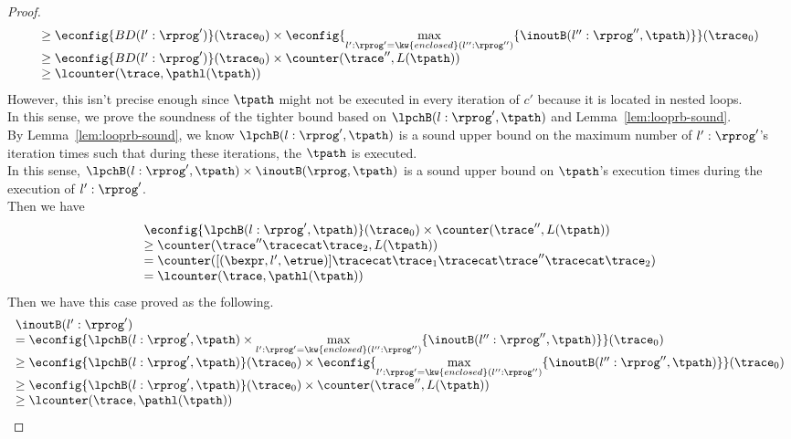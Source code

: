 \begin{proof}
\[\begin{array}{l}
  \geq \econfig{ BD(l':\rprog')}(\trace_0) \times 
  \econfig{\max\limits_{l': \rprog' = \kw{enclosed}(l'':\rprog'')} \{\inoutB(l'':\rprog'', \tpath)\}}
  (\trace_0)\\
  \geq \econfig{ BD(l':\rprog')}(\trace_0) \times \counter(\trace'', L(\tpath)) \\
  \geq \lcounter(\trace, \pathl(\tpath))
  \end{array}
\]
However, this isn't precise enough since $\tpath$ might not be executed in every iteration of $c'$ because it is located in nested loops. 
\\
In this sense, we prove the soundness of the tighter bound based on $\lpchB(l:\rprog', \tpath)$ and Lemma~\ref{lem:looprb-sound}.
\\
By Lemma~\ref{lem:looprb-sound}, we know $\lpchB(l:\rprog', \tpath)$ is a sound upper bound on the maximum number of $l': \rprog'$'s iteration times such that during these iterations, the $\tpath$ is executed.
\\
In this sense, $\lpchB(l:\rprog', \tpath) \times \inoutB(\rprog, \tpath)$ is a sound upper bound on $\tpath$'s execution times during the execution of $l': \rprog'$.
\\
Then we have
\[
  \begin{array}{l}
  \econfig{ \lpchB(l:\rprog', \tpath)}(\trace_0) \times \counter(\trace'', L(\tpath)) \\
  \geq \counter(\trace'' \tracecat \trace_2, L(\tpath))\\
  = \counter([(\bexpr, l', \etrue)] \tracecat \trace_1 \tracecat \trace'' \tracecat \trace_2)\\
  = \lcounter(\trace, \pathl(\tpath))
  \end{array}
\]
Then we have this case proved as the following.
\[
  \begin{array}{l}
  \inoutB(l':\rprog') \\
  = \econfig{ \lpchB(l:\rprog', \tpath) \times \max\limits_{l': \rprog' = \kw{enclosed}(l'':\rprog'')} \{\inoutB(l'':\rprog'', \tpath)\}}(\trace_0) \\
  \geq \econfig{ \lpchB(l:\rprog', \tpath) }(\trace_0) \times
  \econfig{\max\limits_{l': \rprog' = \kw{enclosed}(l'':\rprog'')} \{\inoutB(l'':\rprog'', \tpath)\}} 
  (\trace_0) \\
  \geq \econfig{ \lpchB(l:\rprog', \tpath)}(\trace_0) \times \counter(\trace'', L(\tpath)) \\
  \geq \lcounter(\trace, \pathl(\tpath))
  \end{array}
\]
%

\end{proof}
